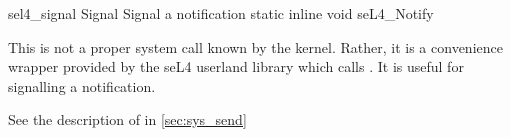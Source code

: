 %
%
%
%

\apidoc
{sel4_signal}
{Signal}
{Signal a notification}
{static inline void seL4\_Notify}
{
}
{\noret}
{
This is not a proper system call
known by the kernel. Rather, it is a convenience
wrapper provided by the seL4 userland library which calls
. It is
useful for signalling a notification.

See the description of  in \autoref{sec:sys_send}
}
